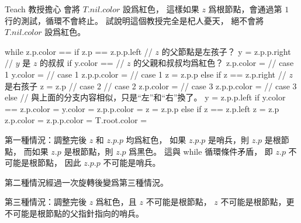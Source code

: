 \startEXERCISE
Teach 教授擔心  會將 $T.nil.color$ 設爲紅色，
這樣如果 $z$ 爲根節點，會通過第 $1$ 行的測試，循環不會終止。
試說明這個教授完全是杞人憂天，
  絕不會將 $T.nil.color$ 設爲紅色。

\startCLRSCODE
while z.p.color == \color[red]{RED}
	if z.p == z.p.p.left	// $z$ 的父節點是左孩子？
		y = z.p.p.right	// $y$ 是 $z$ 的叔叔
		if y.color == \color[red]{RED} // $z$ 的父親和叔叔均爲紅色？
			z.p.color = \color[black]{BLACK} \hfill // case 1
			y.color = \color[black]{BLACK} \hfill // case 1
			z.p.p.color = \color[red]{RED} \hfill // case 1
			z = z.p.p
		else
			if z == z.p.right // $z$ 是右孩子
				z = z.p \hfill // case 2
				 \hfill // case 2
			z.p.color = \color[black]{BLACK} \hfill // case 3
			z.p.p.color = \color[red]{RED} \hfill // case 3
	else // 與上面的分支内容相似，只是“左”和“右”換了。
		y = z.p.p.left
		if y.color == \color[red]{RED}
			z.p.color = \color[black]{BLACK}
			y.color = \color[black]{BLACK}
			z.p.p.color = \color[red]{RED}
			z = z.p.p
		else
			if z == z.p.left
				z = z.p
			z.p.color = \color[black]{BLACK}
			z.p.p.color = \color[red]{RED}
T.root.color = \color[black]{BLACK}
\stopCLRSCODE
\stopEXERCISE

\startANSWER
第一種情況：調整完後 $z$ 和 $z.p.p$ 均爲紅色，
如果 $z.p.p$ 是哨兵，則 $z.p$ 是根節點，
而如果 $z.p$ 是根節點，則 $z.p$ 爲黑色。
這與 while 循環條件矛盾，
即 $z.p$ 不可能是根節點，
因此 $z.p.p$ 不可能是哨兵。

第二種情況經過一次旋轉後變爲第三種情況。

第三種情況：調整完後 $z$ 爲紅色，且 $z$ 不可能是根節點，
 $z$ 不可能是根節點，更不可能是根節點的父指針指向的哨兵。
\stopANSWER
